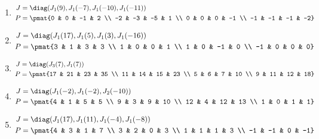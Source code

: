 \begin{enumerate}
\item

\begin{align*}
J &= \diag(J_{1}(9), J_{1}(-7), J_{1}(-10), J_{1}(-11))\\
P &= \pmat{0 & 0 & -1 & 2 \\ -2 & -3 & -5 & 1 \\ 0 & 0 & 0 & -1 \\ -1 & -1 & -1 & -2}
\end{align*}

\item

\begin{align*}
J &= \diag(J_{1}(17), J_{1}(5), J_{1}(3), J_{1}(-16))\\
P &= \pmat{3 & 1 & 3 & 3 \\ 1 & 0 & 0 & 1 \\ 1 & 0 & -1 & 0 \\ -1 & 0 & 0 & 0}
\end{align*}

\item

\begin{align*}
J &= \diag(J_{3}(7), J_{1}(7))\\
P &= \pmat{17 & 21 & 23 & 35 \\ 11 & 14 & 15 & 23 \\ 5 & 6 & 7 & 10 \\ 9 & 11 & 12 & 18}
\end{align*}

\item

\begin{align*}
J &= \diag(J_{1}(-2), J_{1}(-2), J_{2}(-10))\\
P &= \pmat{4 & 1 & 5 & 5 \\ 9 & 3 & 9 & 10 \\ 12 & 4 & 12 & 13 \\ 1 & 0 & 1 & 1}
\end{align*}

\item

\begin{align*}
J &= \diag(J_{1}(17), J_{1}(11), J_{1}(-4), J_{1}(-8))\\
P &= \pmat{4 & 3 & 1 & 7 \\ 3 & 2 & 0 & 3 \\ 1 & 1 & 1 & 3 \\ -1 & -1 & 0 & -1}
\end{align*}


\end{enumerate}
